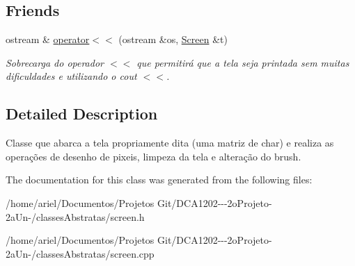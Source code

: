 \subsection*{Friends}
\begin{DoxyCompactItemize}
\item 
\mbox{\label{class_screen_aab6a2880746bfe1b7964817cc8f0989e}} 
ostream \& \hyperlink{class_screen_aab6a2880746bfe1b7964817cc8f0989e}{operator$<$$<$} (ostream \&os, \hyperlink{class_screen}{Screen} \&t)
\begin{DoxyCompactList}\small\item\em Sobrecarga do operador \textquotesingle{}$<$$<$\textquotesingle{} que permitirá que a tela seja printada sem muitas dificuldades e utilizando o cout $<$$<$. \end{DoxyCompactList}\end{DoxyCompactItemize}


\subsection{Detailed Description}
Classe que abarca a tela propriamente dita (uma matriz de char) e realiza as operações de desenho de pixeis, limpeza da tela e alteração do brush. 

The documentation for this class was generated from the following files\+:\begin{DoxyCompactItemize}
\item 
/home/ariel/\+Documentos/\+Projetos Git/\+D\+C\+A1202-\/-\/-\/2o\+Projeto-\/2a\+Un-\//classes\+Abstratas/screen.\+h\item 
/home/ariel/\+Documentos/\+Projetos Git/\+D\+C\+A1202-\/-\/-\/2o\+Projeto-\/2a\+Un-\//classes\+Abstratas/screen.\+cpp\end{DoxyCompactItemize}
